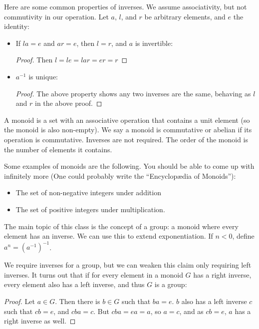 \documentclass{report}
\begin{document}
Here are some common properties of inverses. We assume associativity, but not commutivity in our operation. Let $a$, $l$, and $r$ be arbitrary elements, and $e$ the identity:
\begin{itemize}
    \item If $la = e$ and $ar = e$, then $l = r$, and $a$ is invertible:
    \begin{proof} Then $l = le = lar = er = r$ \end{proof}
    \item $a^{-1}$ is unique:
    \begin{proof} The above property shows any two inverses are the same, behaving as $l$ and $r$ in the above proof. \end{proof}
\end{itemize}

A monoid is a set with an associative operation that contains a unit element (so the monoid is also non-empty). We say a monoid is commutative or abelian if its operation is commutative. Inverses are not required. The order of the monoid is the number of elements it contains.

Some examples of monoids are the following. You should be able to come up with infinitely more (One could probably write the ``Encyclop\ae dia of Monoids''):
\begin{itemize}
    \item The set of non-negative integers under addition
    \item The set of positive integers under multiplication.
\end{itemize}

The main topic of this class is the concept of a group: a monoid where every element has an inverse. We can use this to extend exponentiation. If $n < 0$, define $a^n = (a^{-1})^{-1}$.

We require inverses for a group, but we can weaken this claim only requiring left inverses. It turns out that if for every element in a monoid $G$ has a right inverse, every element also has a left inverse, and thus $G$ is a group:
\begin{proof}
    Let $a \in G$. Then there is $b \in G$ such that $ba = e$. $b$ also has a left inverse $c$ such that $cb = e$, and $cba = c$. But $cba = ea = a$, so $a = c$, and as $cb = e$, $a$ has a right inverse as well.
\end{proof}
\end{document}
